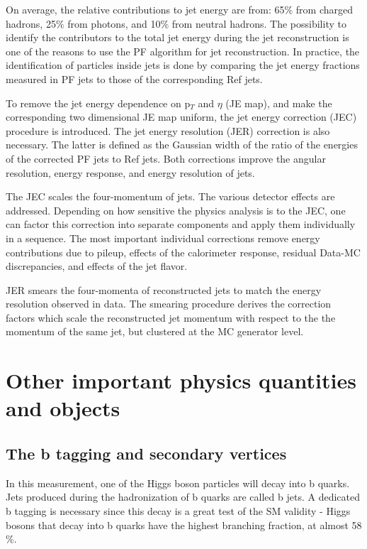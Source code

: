 On average, the relative contributions to jet energy are from: 65$\%$ from charged hadrons, 25$\%$ from photons, and 10$\%$ from neutral hadrons. The possibility to identify the contributors to the total jet energy during the jet reconstruction is one of the reasons to use the PF algorithm for jet reconstruction. In practice, the identification of particles inside jets is done by comparing the jet energy fractions measured in PF jets to those of the corresponding Ref jets.

To remove the jet energy dependence on p$_T$ and $\eta$ (JE map), and make the corresponding two dimensional JE map uniform, the jet energy correction (JEC) procedure is introduced. The jet energy resolution (JER) correction is also necessary. The latter is defined as the Gaussian width of the ratio of the energies of the corrected PF jets to Ref jets. Both corrections improve the angular resolution, energy response, and energy resolution of jets. 

The JEC scales the four-momentum of jets. The various detector effects are addressed. Depending on how sensitive the physics analysis is to the JEC, one can factor this correction into separate components and apply them individually in a sequence. The most important individual corrections remove energy contributions due to pileup, effects of the calorimeter response, residual Data-MC discrepancies, and effects of the jet flavor.

JER smears the four-momenta of reconstructed jets to match the energy resolution observed in data. The smearing procedure derives the correction factors which scale the reconstructed jet momentum with respect to the the momentum of the same jet, but clustered at the MC generator level.

\section{Other important physics quantities and objects}
\subsection{The b tagging and secondary vertices}\label{sec:btag}

In this measurement, one of the Higgs boson particles will decay into b quarks. Jets produced during the hadronization of b quarks are called b jets. A dedicated b tagging is necessary since this decay is a great test of the SM validity - Higgs bosons that decay into b quarks have the highest branching fraction, at almost 58$\%$. 

